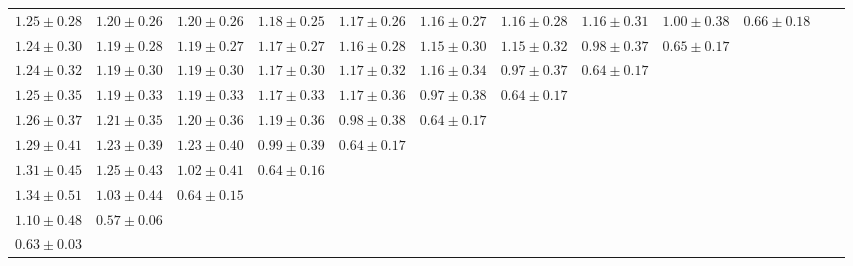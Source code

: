 \begin{table}[ht]
{{\begin{adjustbox}{width=\textwidth}
\begin{tabular}{cccccccccccc}
$1.25 \pm 0.28$ & $1.20 \pm 0.26$ & $1.20 \pm 0.26$ & $1.18 \pm 0.25$ & $1.17 \pm 0.26$ & $1.16 \pm 0.27$ & $1.16 \pm 0.28$ & $1.16 \pm 0.31$ & $1.00 \pm 0.38$ & $0.66 \pm 0.18$ &  &  \\
$1.24 \pm 0.30$ & $1.19 \pm 0.28$ & $1.19 \pm 0.27$ & $1.17 \pm 0.27$ & $1.16 \pm 0.28$ & $1.15 \pm 0.30$ & $1.15 \pm 0.32$ & $0.98 \pm 0.37$ & $0.65 \pm 0.17$ &  &  &  \\
$1.24 \pm 0.32$ & $1.19 \pm 0.30$ & $1.19 \pm 0.30$ & $1.17 \pm 0.30$ & $1.17 \pm 0.32$ & $1.16 \pm 0.34$ & $0.97 \pm 0.37$ & $0.64 \pm 0.17$ &  &  &  &  \\
$1.25 \pm 0.35$ & $1.19 \pm 0.33$ & $1.19 \pm 0.33$ & $1.17 \pm 0.33$ & $1.17 \pm 0.36$ & $0.97 \pm 0.38$ & $0.64 \pm 0.17$ &  &  &  &  &  \\
$1.26 \pm 0.37$ & $1.21 \pm 0.35$ & $1.20 \pm 0.36$ & $1.19 \pm 0.36$ & $0.98 \pm 0.38$ & $0.64 \pm 0.17$ &  &  &  &  &  &  \\
$1.29 \pm 0.41$ & $1.23 \pm 0.39$ & $1.23 \pm 0.40$ & $0.99 \pm 0.39$ & $0.64 \pm 0.17$ &  &  &  &  &  &  &  \\
$1.31 \pm 0.45$ & $1.25 \pm 0.43$ & $1.02 \pm 0.41$ & $0.64 \pm 0.16$ &  &  &  &  &  &  &  &  \\
$1.34 \pm 0.51$ & $1.03 \pm 0.44$ & $0.64 \pm 0.15$ &  &  &  &  &  &  &  &  &  \\
$1.10 \pm 0.48$ & $0.57 \pm 0.06$ &  &  &  &  &  &  &  &  &  &  \\
$0.63 \pm 0.03$ &  &  &  &  &  &  &  &  &  &  &  \\


\end{tabular}
\end{adjustbox}
}
}


\end{table}
